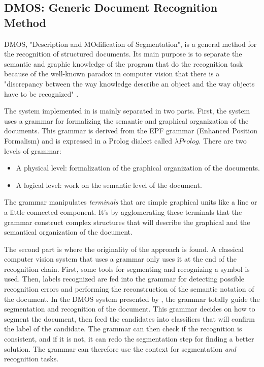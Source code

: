 \documentclass[11pt]{sdm}
\begin{document}
\subsection{DMOS: Generic Document Recognition Method}

DMOS, "Description and MOdification of Segmentation", is a general method for the recognition of structured documents.
Its main purpose is to separate the semantic and graphic knowledge of the program that do the recognition task because of the well-known paradox in computer vision that there is a "discrepancy between the way knowledge describe an object and the way objects have to be recognized" \cite{couasnon_dmos_2001}.

The system implemented in \cite{couasnon_dmos_2001} is mainly separated in two parts.
First, the system uses a grammar for formalizing the semantic and graphical organization of the documents.
This grammar is derived from the EPF grammar (Enhanced Position Formalism) and is expressed in a Prolog dialect called $\lambda Prolog$.
There are two levels of grammar:
\begin{itemize}
  \item A physical level: formalization of the graphical organization of the documents.
  \item A logical level: work on the semantic level of the document.
\end{itemize}
The grammar manipulates \textit{terminals} that are simple graphical units like a line or a little connected component.
It’s by agglomerating these terminals that the grammar construct complex structures that will describe the graphical and the semantical organization of the document.

The second part is where the originality of the approach is found.
A classical computer vision system that uses a grammar only uses it at the end of the recognition chain.
First, some tools for segmenting and recognizing a symbol is used.
Then, labels recognized are fed into the grammar for detecting possible recognition errors and performing the reconstruction of the semantic notation of the document.
In the DMOS system presented by \cite{couasnon_dmos_2001}, the grammar totally guide the segmentation and recognition of the document.
This grammar decides on how to segment the document, then feed the candidates into classifiers that will confirm the label of the candidate.
The grammar can then check if the recognition is consistent, and if it is not, it can redo the segmentation step for finding a better solution.
The grammar can therefore use the context for segmentation \textit{and} recognition tasks.
\end{document}
